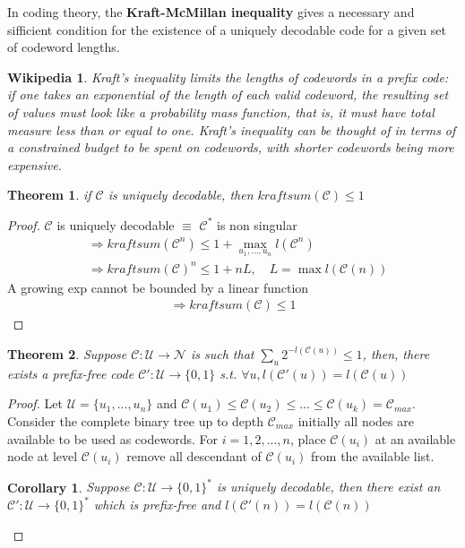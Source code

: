 \documentclass[twoside]{article}
\newtheorem{theorem}{Theorem}[section]
\newtheorem{corollary}{Corollary}[theorem]
\newtheorem*{wikipedia}{Wikipedia}
\theoremstyle{definition} %
\def\U{\mathcal{U}}
\def\N{\mathcal{N}}
\def\C{\mathcal{C}}
\begin{document}
In coding theory, the \textbf{Kraft-McMillan inequality} gives a necessary and sifficient condition for the existence of a uniquely decodable code for a given set of codeword lengths.

\begin{wikipedia}
  Kraft's inequality limits the lengths of codewords in a prefix code: if one takes an exponential of the length of each valid codeword, the resulting set of values must look like a probability mass function, that is, it must have total measure less than or equal to one. Kraft's inequality can be thought of in terms of a constrained budget to be spent on codewords, with shorter codewords being more expensive.
\end{wikipedia}

\begin{theorem}
  if $\C$ is uniquely decodable, then $kraftsum(\C) \leq 1$
\end{theorem}

\begin{proof}
  $\C$ is uniquely decodable $\equiv$ $\C^*$ is non singular
  \begin{align*}
    &\Rightarrow kraftsum(\C^n) \leq 1 + \max _{u_1, ..., u_n} l(\C^n) \\
    &\Rightarrow kraftsum(\C)^n \leq 1 + n L, \quad L = \max l(\C(n))
  \end{align*}
  A growing exp cannot be bounded by a linear function
  \begin{align*}
    \Rightarrow kraftsum(\C) \leq 1
  \end{align*}
\end{proof}

\begin{theorem}
  Suppose $\C : \U \rightarrow \N$ is such that $\sum_u 2^{-l(\C(u))} \leq 1$, then, there exists a prefix-free code $\C': \U \rightarrow \{0, 1\}$ s.t. $\forall u, l(\C'(u)) = l(\C(u))$
\end{theorem}

\begin{proof}
  Let $\U = \{u_1, ..., u_n\}$ and $\C(u_1) \leq \C(u_2) \leq ... \leq \C(u_k) = \C_{max}$.
  Consider the complete binary tree up to depth $\C_{max}$ initially all nodes are available to be used as codewords.
  For $i = 1, 2, ..., n$, place $\C(u_i)$ at an available node at level $\C(u_i)$ remove all descendant of $\C(u_i)$ from the available list.

  \begin{corollary}
    Suppose $\C: \U \rightarrow \{0, 1\}^*$ is uniquely decodable, then there exist an $\C': \U \rightarrow \{0, 1\}^*$ which is prefix-free and $l(\C'(n)) = l(\C(n))$
  \end{corollary}
\end{proof}
\end{document}
